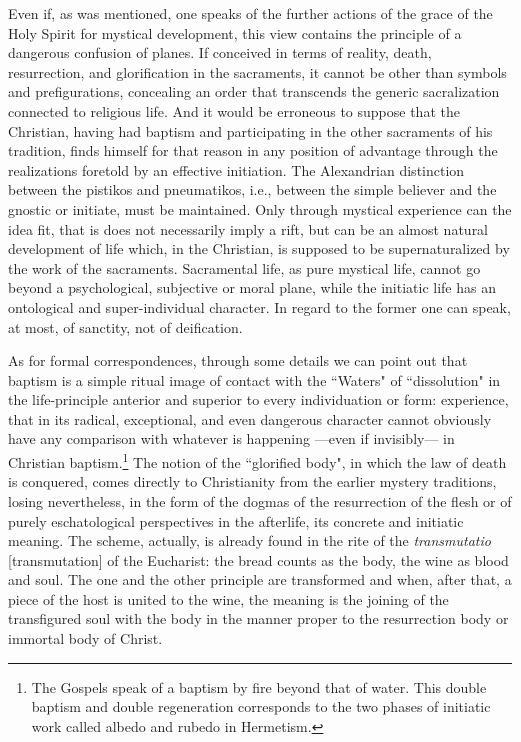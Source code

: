 Even if, as was mentioned, one speaks of the further actions of the grace of the Holy Spirit for mystical development, this view contains the principle of a dangerous confusion of planes. If conceived in terms of reality, death, resurrection, and glorification in the sacraments, it cannot be other than symbols and prefigurations, concealing an order that transcends the generic sacralization connected to religious life. And it would be erroneous to suppose that the Christian, having had baptism and participating in the other sacraments of his tradition, finds himself for that reason in any position of advantage through the realizations foretold by an effective initiation. The Alexandrian distinction between the pistikos and pneumatikos, i.e., between the simple believer and the gnostic or initiate, must be maintained. Only through mystical experience can the idea fit, that is does not necessarily imply a rift, but can be an almost natural development of life which, in the Christian, is supposed to be supernaturalized by the work of the sacraments. Sacramental life, as pure mystical life, cannot go beyond a psychological, subjective or moral plane, while the initiatic life has an ontological and super-individual character. In regard to the former one can speak, at most, of sanctity, not of deification.

As for formal correspondences, through some details we can point out that baptism is a simple ritual image of contact with the ``Waters" of ``dissolution" in the life-principle anterior and superior to every individuation or form: experience, that in its radical, exceptional, and even dangerous character cannot obviously have any comparison with whatever is happening —even if invisibly— in Christian baptism.\footnote{The Gospels speak of a baptism by fire beyond that of water. This double baptism and double regeneration corresponds to the two phases of initiatic work called albedo and rubedo in Hermetism.} The notion of the ``glorified body", in which the law of death is conquered, comes directly to Christianity from the earlier mystery traditions, losing nevertheless, in the form of the dogmas of the resurrection of the flesh or of purely eschatological perspectives in the afterlife, its concrete and initiatic meaning. The scheme, actually, is already found in the rite of the \textit{transmutatio} [transmutation] of the Eucharist: the bread counts as the body, the wine as blood and soul. The one and the other principle are transformed and when, after that, a piece of the host is united to the wine, the meaning is the joining of the transfigured soul with the body in the manner proper to the resurrection body or immortal body of Christ.

